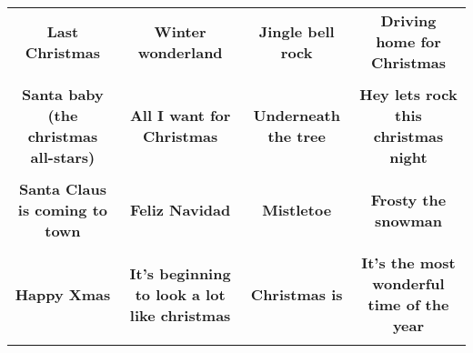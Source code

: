 \documentclass[12pt]{article} \usepackage{eso-pic, graphicx}
\newcommand{\background}[1]{%
\AddToShipoutPictureBG*{\texttt{[image: \#1]}}
}
\begin{document}
\tabcolsep=30.2pt \renewcommand{\arraystretch}{4.5}   \vspace*{4.3cm} \begin{center}  \begin{tabular}{c c c c}
\parbox{3cm}{\centering \textbf{Last Christmas}}& 
\parbox{3cm}{\centering \textbf{Winter wonderland}}& 
\parbox{3cm}{\centering \textbf{Jingle bell rock}}& 
\parbox{3cm}{\centering \textbf{Driving home for Christmas}}\\ \\ 
\parbox{3cm}{\centering \textbf{Santa baby (the christmas all-stars)}}& 
\parbox{3cm}{\centering \textbf{All I want for Christmas}}& 
\parbox{3cm}{\centering \textbf{Underneath the tree}}& 
\parbox{3cm}{\centering \textbf{Hey lets rock this christmas night}}\\ \\ 
\parbox{3cm}{\centering \textbf{Santa Claus is coming to town}}& 
\parbox{3cm}{\centering \textbf{Feliz Navidad}}& 
\parbox{3cm}{\centering \textbf{Mistletoe}}& 
\parbox{3cm}{\centering \textbf{Frosty the snowman}}\\ \\ 
\parbox{3cm}{\centering \textbf{Happy Xmas}}& 
\parbox{3cm}{\centering \textbf{It’s beginning to look a lot like christmas}}& 
\parbox{3cm}{\centering \textbf{Christmas is}}& 
\parbox{3cm}{\centering \textbf{It’s the most wonderful time of the year}}\\ \\ 
\end{tabular} \background{discobingo.pdf} \end{center} 
\end{document}
